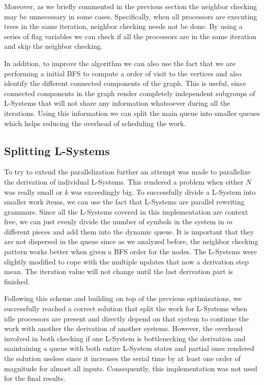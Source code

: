 \documentclass[letterpaper,twoside,11pt]{article}
\begin{document}
\begin{multicols}{2}
Moreover, as we briefly commented in the previous section the neighbor checking may be unnecessary in some cases. Specifically, when all processors are executing trees in the same iteration, neighbor checking needs not be done. By using a series of flag variables we can check if all the processors are in the same iteration and skip the neighbor checking.

In addition, to improve  the algorithm we can also use the fact that we are performing a initial BFS to compute a order of visit to the vertices and also identify the different connected components of the graph. This is useful, since connected components in the graph render completely independent subgroups of L-Systems that will not share any information whatsoever during all the iterations. Using this information we can split the main queue into smaller queues which helps reducing the overhead of scheduling the work.


\subsection{Splitting L-Systems} %
\label{sub:splitting_l_systems}

To try to extend the parallelization further an attempt was made to parallelize the derivation of individual L-Systems. This rendered a problem when either $N$ was really small or $k$ was exceedingly big. To successfully divide a L-System into smaller work items, we can use the fact that L-Systems are parallel rewriting grammars. Since all the L-Systems covered in this implementation are context free, we can just evenly divide the number of symbols in the system in $m$ different pieces and add them into the dynamic queue. It is important that they are not dispersed in the queue since as we analyzed before, the neighbor checking pattern works better when given a BFS order for the nodes. The L-Systems were slightly modified to cope with the multiple updates that now a derivation step mean. The iteration value will not change until the last derivation part is finished.

Following this scheme and building on top of the previous optimizations, we successfully reached a correct solution that split the work for L-Systems when idle processors are present and directly depend on that system to continue the work with another the derivation of another systems. However, the overhead involved in both checking if one L-System is bottlenecking the derivation and maintaining a queue with both entire L-System states and partial ones rendered the solution useless since it increases the serial time by at least one order of magnitude for almost all inputs. Consequently, this implementation was not used for the final results.


\end{multicols}
\end{document}
